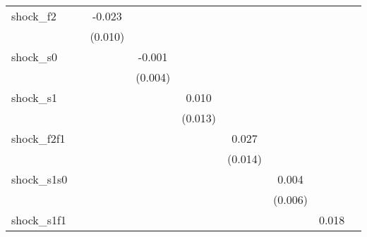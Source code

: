 {\begin{tabular}{l*{8}{c}}
\addlinespace
shock\_f2    &                     &      -0.023\sym{**} &                     &                     &                     &                     &                     &                     \\
            &                     &     (0.010)         &                     &                     &                     &                     &                     &                     \\
\addlinespace
shock\_s0    &                     &                     &      -0.001         &                     &                     &                     &                     &                     \\
            &                     &                     &     (0.004)         &                     &                     &                     &                     &                     \\
\addlinespace
shock\_s1    &                     &                     &                     &       0.010         &                     &                     &                     &                     \\
            &                     &                     &                     &     (0.013)         &                     &                     &                     &                     \\
\addlinespace
shock\_f2f1  &                     &                     &                     &                     &       0.027\sym{*}  &                     &                     &                     \\
            &                     &                     &                     &                     &     (0.014)         &                     &                     &                     \\
\addlinespace
shock\_s1s0  &                     &                     &                     &                     &                     &       0.004         &                     &                     \\
            &                     &                     &                     &                     &                     &     (0.006)         &                     &                     \\
\addlinespace
shock\_s1f1  &                     &                     &                     &                     &                     &                     &       0.018         &                     \\

\end{tabular}}
